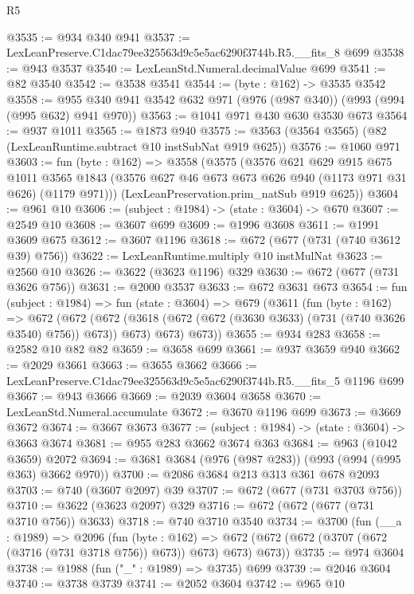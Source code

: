 \begin{lexlean}{R5}
\begin{coremodule}
@3535 := @934 @340 @941
@3537 := LexLeanPreserve.C1dac79ee325563d9c5e5ac6290f3744b.R5.__fits_8 @699
@3538 := @943 @3537
@3540 := LexLeanStd.Numeral.decimalValue @699
@3541 := @82 @3540
@3542 := @3538 @3541
@3544 := (byte : @162) -> @3535 @3542
@3558 := @955 @340 @941 @3542 @632 @971 (@976 (@987 @340)) (@993 (@994 (@995 @632) @941 @970))
@3563 := @1041 @971 @430 @630 @3530 @673
@3564 := @937 @1011
@3565 := @1873 @940
@3575 := @3563 (@3564 @3565) (@82 (LexLeanRuntime.subtract @10 instSubNat @919 @625))
@3576 := @1060 @971
@3603 := fun (byte : @162) =>
  @3558
    (@3575
      (@3576
        @621
        @629
        @915
        @675
        @1011
        @3565
        @1843
        (@3576 @627 @46 @673 @673 @626 @940 (@1173 @971 @31 @626) (@1179 @971)))
      (LexLeanPreservation.prim_natSub @919 @625))
@3604 := @961 @10
@3606 := (subject : @1984) -> (state : @3604) -> @670
@3607 := @2549 @10
@3608 := @3607 @699
@3609 := @1996 @3608
@3611 := @1991 @3609 @675
@3612 := @3607 @1196
@3618 := @672 (@677 (@731 (@740 @3612 @39) @756))
@3622 := LexLeanRuntime.multiply @10 instMulNat
@3623 := @2560 @10
@3626 := @3622 (@3623 @1196) @329
@3630 := @672 (@677 (@731 @3626 @756))
@3631 := @2000 @3537
@3633 := @672 @3631 @673
@3654 := fun (subject : @1984) =>
  fun (state : @3604) =>
  @679
    (@3611
      (fun (byte : @162) =>
      @672
        (@672
          (@672 (@3618 (@672 (@672 (@3630 @3633) (@731 (@740 @3626 @3540) @756)) @673)) @673)
          @673)
        @673))
@3655 := @934 @283
@3658 := @2582 @10 @82 @82
@3659 := @3658 @699
@3661 := @937 @3659 @940
@3662 := @2029 @3661
@3663 := @3655 @3662
@3666 := LexLeanPreserve.C1dac79ee325563d9c5e5ac6290f3744b.R5.__fits_5 @1196 @699
@3667 := @943 @3666
@3669 := @2039 @3604 @3658
@3670 := LexLeanStd.Numeral.accumulate
@3672 := @3670 @1196 @699
@3673 := @3669 @3672
@3674 := @3667 @3673
@3677 := (subject : @1984) -> (state : @3604) -> @3663 @3674
@3681 := @955 @283 @3662 @3674 @363
@3684 := @963 (@1042 @3659) @2072
@3694 := @3681 @3684 (@976 (@987 @283)) (@993 (@994 (@995 @363) @3662 @970))
@3700 := @2086 @3684 @213 @313 @361 @678 @2093
@3703 := @740 (@3607 @2097) @39
@3707 := @672 (@677 (@731 @3703 @756))
@3710 := @3622 (@3623 @2097) @329
@3716 := @672 (@672 (@677 (@731 @3710 @756)) @3633)
@3718 := @740 @3710 @3540
@3734 := @3700
    (fun (__a : @1989) =>
    @2096
      (fun (byte : @162) =>
      @672 (@672 (@672 (@3707 (@672 (@3716 (@731 @3718 @756)) @673)) @673) @673) @673))
@3735 := @974 @3604
@3738 := @1988 (fun ("_" : @1989) => @3735) @699
@3739 := @2046 @3604
@3740 := @3738 @3739
@3741 := @2052 @3604
@3742 := @965 @10

\end{coremodule}
\end{lexlean}
